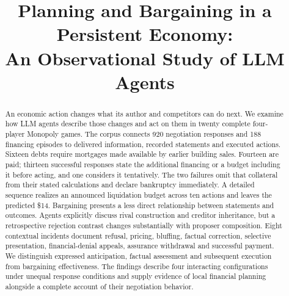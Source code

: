 \documentclass[10pt,twocolumn,letterpaper]{article}
\title{Planning and Bargaining in a Persistent Economy:\\An Observational Study of LLM Agents}
\author{}
\date{}
\begin{document}




\maketitle
\begin{abstract}
An economic action changes what its author and competitors can do next. We examine how LLM agents describe those changes and act on them in twenty complete four-player Monopoly games. The corpus connects 920 negotiation responses and 188 financing episodes to delivered information, recorded statements and executed actions. Sixteen debts require mortgages made available by earlier building sales. Fourteen are paid; thirteen successful responses state the additional financing or a budget including it before acting, and one considers it tentatively. The two failures omit that collateral from their stated calculations and declare bankruptcy immediately. A detailed sequence realizes an announced liquidation budget across ten actions and leaves the predicted \$14. Bargaining presents a less direct relationship between statements and outcomes. Agents explicitly discuss rival construction and creditor inheritance, but a retrospective rejection contrast changes substantially with proposer composition. Eight contextual incidents document refusal, pricing, bluffing, factual correction, selective presentation, financial-denial appeals, assurance withdrawal and successful payment. We distinguish expressed anticipation, factual assessment and subsequent execution from bargaining effectiveness. The findings describe four interacting configurations under unequal response conditions and supply evidence of local financial planning alongside a complete account of their negotiation behavior.
\end{abstract}






\begingroup\small\setlength{\bibsep}{2pt}

\endgroup
\clearpage\onecolumn\appendix

\end{document}
